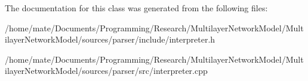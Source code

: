 The documentation for this class was generated from the following files\+:\begin{DoxyCompactItemize}
\item 
/home/mate/\+Documents/\+Programming/\+Research/\+Multilayer\+Network\+Model/\+Multilayer\+Network\+Model/sources/parser/include/interpreter.\+h\item 
/home/mate/\+Documents/\+Programming/\+Research/\+Multilayer\+Network\+Model/\+Multilayer\+Network\+Model/sources/parser/src/interpreter.\+cpp\end{DoxyCompactItemize}
